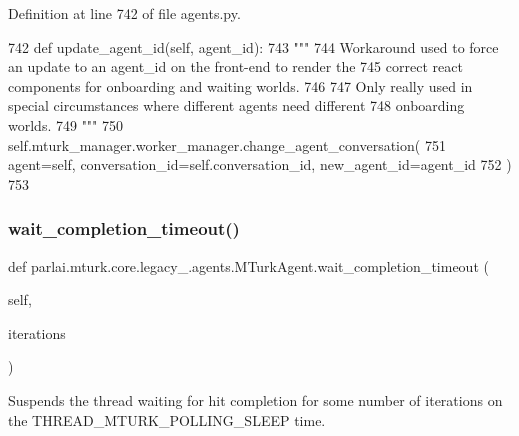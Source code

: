 Definition at line 742 of file agents.\+py.


\begin{DoxyCode}
742     \textcolor{keyword}{def }update\_agent\_id(self, agent\_id):
743         \textcolor{stringliteral}{"""}
744 \textcolor{stringliteral}{        Workaround used to force an update to an agent\_id on the front-end to render the}
745 \textcolor{stringliteral}{        correct react components for onboarding and waiting worlds.}
746 \textcolor{stringliteral}{}
747 \textcolor{stringliteral}{        Only really used in special circumstances where different agents need different}
748 \textcolor{stringliteral}{        onboarding worlds.}
749 \textcolor{stringliteral}{        """}
750         self.mturk\_manager.worker\_manager.change\_agent\_conversation(
751             agent=self, conversation\_id=self.conversation\_id, new\_agent\_id=agent\_id
752         )
753 \end{DoxyCode}
\mbox{\label{classparlai_1_1mturk_1_1core_1_1legacy__2018_1_1agents_1_1MTurkAgent_af12ef4e56cea2b9800123c43227513d8}} 
\subsubsection{\texorpdfstring{wait\+\_\+completion\+\_\+timeout()}{wait\_completion\_timeout()}}
{\footnotesize\ttfamily def parlai.\+mturk.\+core.\+legacy\+\_.\+agents.\+M\+Turk\+Agent.\+wait\+\_\+completion\+\_\+timeout (\begin{DoxyParamCaption}\item[{}]{self,  }\item[{}]{iterations }\end{DoxyParamCaption})}

\begin{DoxyVerb}Suspends the thread waiting for hit completion for some number of iterations on
the THREAD_MTURK_POLLING_SLEEP time.
\end{DoxyVerb}
 

